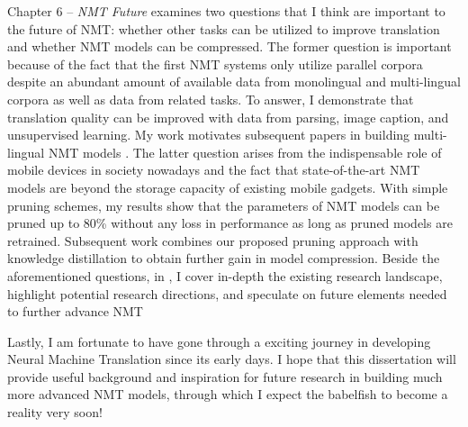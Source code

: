 Chapter 6 -- {\it NMT Future} examines two questions that I think are important to the future of NMT: whether other tasks can be utilized to improve translation and whether NMT models can be compressed. The former question is important because of the fact that the first NMT systems only utilize parallel corpora despite an abundant amount of available data from monolingual and multi-lingual corpora as well as data from related tasks. To answer, 
I demonstrate that translation quality can be improved with data from parsing, image caption, and unsupervised learning. My work motivates subsequent papers in building multi-lingual NMT models \cite{zoph16,firat16,gnmt16multi,ha16}.
 The latter question arises from the indispensable role of mobile devices in society nowadays and the fact that state-of-the-art NMT models are beyond the storage capacity of existing mobile gadgets. With simple pruning schemes, my results show that the parameters of NMT models can be pruned up to 80\% without any loss in performance as long as pruned models are retrained. Subsequent work \cite{kim16distill} combines our proposed pruning approach with knowledge distillation to obtain further gain in model compression. Beside the aforementioned questions, in , I cover in-depth the existing research landscape, highlight potential research directions, and speculate on future elements needed to further advance NMT 

Lastly, I am fortunate to have gone through a exciting journey in developing Neural Machine Translation since its early days. I hope that this dissertation will provide useful background and inspiration for future research in building much more advanced NMT models, through which I expect the babelfish to become a reality very soon!
